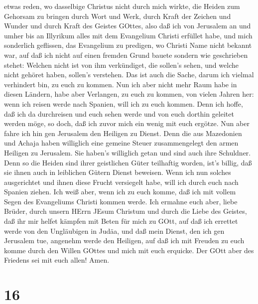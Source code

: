etwas reden, wo dasselbige Christus nicht durch mich wirkte, die Heiden
zum Gehorsam zu bringen durch Wort und Werk,  durch Kraft
der Zeichen und Wunder und durch Kraft des Geistes GOttes, also daß ich
von Jerusalem an und umher bis an Illyrikum alles mit dem Evangelium
Christi erfüllet habe,  und mich sonderlich geflissen, das
Evangelium zu predigen, wo Christi Name nicht bekannt war, auf daß ich
nicht auf einen fremden Grund bauete  sondern wie
geschrieben stehet: Welchen nicht ist von ihm verkündiget, die sollen's
sehen, und welche nicht gehöret haben, sollen's verstehen. 
Das ist auch die Sache, darum ich vielmal verhindert bin, zu euch zu
kommen.  Nun ich aber nicht mehr Raum habe in diesen
Ländern, habe aber Verlangen, zu euch zu kommen, von vielen Jahren her:
 wenn ich reisen werde nach Spanien, will ich zu euch
kommen. Denn ich hoffe, daß ich da durchreisen und euch sehen werde und
von euch dorthin geleitet werden möge, so doch, daß ich zuvor mich ein
wenig mit euch ergötze.  Nun aber fahre ich hin gen
Jerusalem den Heiligen zu Dienst.  Denn die aus Mazedonien
und Achaja haben williglich eine gemeine Steuer zusammengelegt den armen
Heiligen zu Jerusalem.  Sie haben's williglich getan und
sind auch ihre Schuldner. Denn so die Heiden sind ihrer geistlichen
Güter teilhaftig worden, ist's billig, daß sie ihnen auch in leiblichen
Gütern Dienst beweisen.  Wenn ich nun solches ausgerichtet
und ihnen diese Frucht versiegelt habe, will ich durch euch nach Spanien
ziehen.  Ich weiß aber, wenn ich zu euch komme, daß ich mit
vollem Segen des Evangeliums Christi kommen werde.  Ich
ermahne euch aber, liebe Brüder, durch unsern HErrn JEsum Christum und
durch die Liebe des Geistes, daß ihr mir helfet kämpfen mit Beten für
mich zu GOtt,  auf daß ich errettet werde von den
Ungläubigen in Judäa, und daß mein Dienst, den ich gen Jerusalem tue,
angenehm werde den Heiligen,  auf daß ich mit Freuden zu
euch komme durch den Willen GOttes und mich mit euch erquicke.
 Der GOtt aber des Friedens sei mit euch allen! Amen.

\hypertarget{section-15}{%
\section{16}\label{section-15}}

